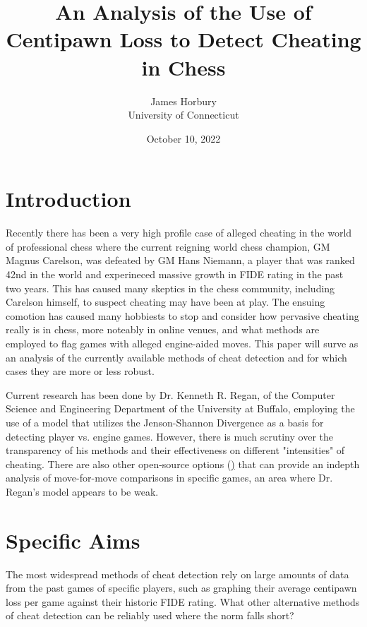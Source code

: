 \documentclass[12pt]{article}
\title{An Analysis of the Use of Centipawn Loss to Detect Cheating in Chess}
\author{James Horbury\\
    University of Connecticut
}
\date{October 10, 2022}
\begin{document}
\maketitle

\section*{Introduction}
\label{sec:intro}

Recently there has been a very high profile case of alleged cheating in the world of professional chess 
where the current reigning world chess champion, GM Magnus Carelson, was defeated by GM Hans Niemann, a player 
that was ranked 42nd in the world and experineced massive growth in FIDE rating in the past two years. This 
has caused many skeptics in the chess community, including Carelson himself, to suspect cheating may have been 
at play. The ensuing comotion has caused many hobbiests to stop and consider how pervasive cheating
really is in chess, more noteably in online venues, and what methods are employed to flag games with alleged 
engine-aided moves. This paper will surve as an analysis of the currently available methods of cheat detection 
and for which cases they are more or less robust.

Current research \citep{regan2011understanding} has been done by Dr. Kenneth R. Regan, of the Computer Science and Engineering 
Department of the University at Buffalo, employing the use of a model that utilizes the Jenson-Shannon 
Divergence as a basis for detecting player vs. engine games. However, there is much scrutiny over the 
transparency of his methods and their effectiveness on different "intensities" of cheating. There are also 
other open-source options (\href{https://github.com/MGleason1/PGN-Spy}) that can provide an indepth analysis of move-for-move comparisons
in specific games, an area where Dr. Regan's model appears to be weak.

\section*{Specific Aims}
\label{sec:spec}

The most widespread methods of cheat detection rely on large amounts of data from the past games of specific 
players, such as graphing their average centipawn loss per game against their historic FIDE rating. What other 
alternative methods of cheat detection can be reliably used where the norm falls short?
\end{document}
